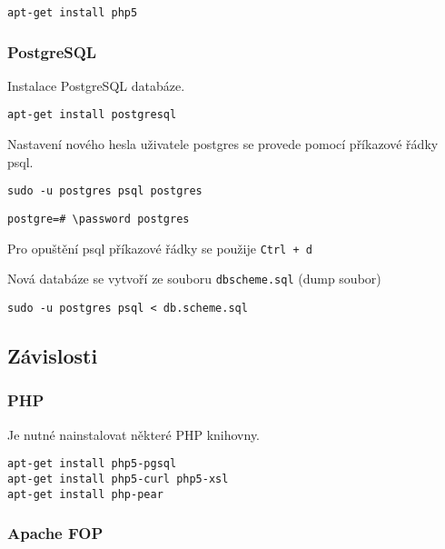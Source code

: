 \documentclass[12pt]{article}
\begin{document}
\begin{lstlisting}
apt-get install php5
\end{lstlisting}

\subsubsection{PostgreSQL} \label{pgsql}

Instalace PostgreSQL databáze.

\begin{lstlisting}
apt-get install postgresql
\end{lstlisting}

Nastavení nového hesla uživatele postgres se provede pomocí příkazové řádky psql.

\begin{lstlisting}
sudo -u postgres psql postgres
\end{lstlisting}

\begin{lstlisting}
postgre=# \password postgres
\end{lstlisting}

Pro opuštění psql příkazové řádky se použije \texttt{Ctrl + d}\newline

Nová databáze se vytvoří ze souboru \texttt{dbscheme.sql} (dump soubor)

\begin{lstlisting}
sudo -u postgres psql < db.scheme.sql
\end{lstlisting}

\subsection{Závislosti}

\subsubsection{PHP}

Je nutné nainstalovat některé PHP knihovny.

\begin{lstlisting}
apt-get install php5-pgsql
apt-get install php5-curl php5-xsl
apt-get install php-pear
\end{lstlisting}

\subsubsection{Apache FOP} 
\end{document}
